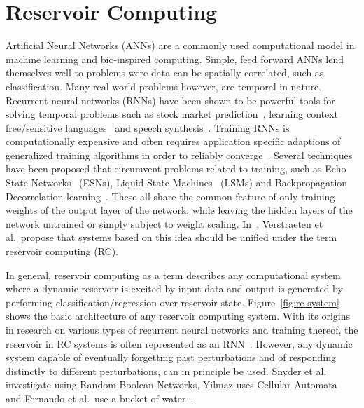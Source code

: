 
\clearpage

\section{Reservoir Computing}

Artificial Neural Networks (ANNs) are a commonly used computational model in
machine learning and bio-inspired computing. Simple, feed forward ANNs lend
themselves well to problems were data can be spatially correlated, such as
classification. Many real world problems however, are temporal in nature.
Recurrent neural networks (RNNs) have been shown to be powerful tools for
solving temporal problems such as stock market prediction~\cite{Lawrence2001},
learning context free/sensitive languages~\cite{Gers2001} and speech
synthesis~\cite{Wu2016}. Training RNNs is computationally expensive and often
requires application specific adaptions of generalized training algorithms in
order to reliably converge~\cite{Hammer2002}. Several techniques have been
proposed that circumvent problems related to training, such as Echo State
Networks~\cite{Jaeger2001} (ESNs), Liquid State Machines~\cite{Maass2002} (LSMs)
and Backpropagation Decorrelation learning~\cite{Steil2004}. These all share the
common feature of only training weights of the output layer of the network,
while leaving the hidden layers of the network untrained or simply subject to
weight scaling. In~\cite{Verstraeten2007}, Verstraeten et al.\ propose that
systems based on this idea should be unified under the term reservoir computing
(RC).

In general, reservoir computing as a term describes any computational system
where a dynamic reservoir is excited by input data and output is generated by
performing classification/regression over reservoir state.
Figure~\ref{fig:rc-system} shows the basic architecture of any reservoir
computing system. With its origins in research on various types of recurrent
neural networks and training thereof, the reservoir in RC systems is often
represented as an RNN~\cite{Verstraeten2007}. However, any dynamic system
capable of eventually forgetting past perturbations and of responding distinctly
to different perturbations, can in principle be used. Snyder et
al.~\cite{Snyder2013} investigate using Random Boolean Networks, Yilmaz uses
Cellular Automata~\cite{Yilmaz2014} and Fernando et al.\ use a bucket of
water~\cite{Fernando2003}.

